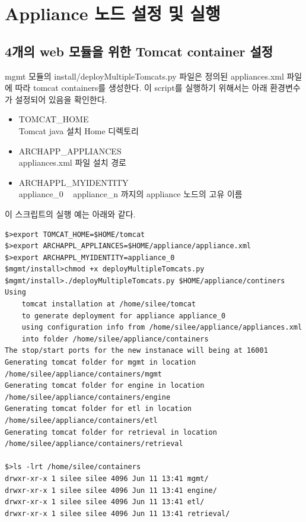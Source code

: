 \documentclass[11pt
  , a4paper
  , article
  , oneside
]{memoir}
\begin{document}
\section{Appliance 노드 설정 및 실행}
\subsection {4개의 web 모듈을 위한 Tomcat container 설정}
 mgmt 모듈의 install/deployMultipleTomcats.py 파일은 정의된 appliances.xml 파일에 따라 tomcat containers를 생성한다. 이 script를 실행하기 위해서는 아래 환경변수가 설정되어 있음을 확인한다.
 \begin{itemize}
 	\item TOMCAT\_HOME \\
 	Tomcat java 설치 Home 디렉토리
 	\item ARCHAPP\_APPLIANCES \\
 	appliances.xml 파일 설치 경로 
 	\item ARCHAPPL\_MYIDENTITY \\
 	appliance\_0 ~ appliance\_n 까지의 appliance 노드의 고유 이름
 \end{itemize}
 
 이 스크립트의 실행 예는 아래와 같다.
 
\begin{lstlisting}[style=termstyle]
$>export TOMCAT_HOME=$HOME/tomcat
$>export ARCHAPPL_APPLIANCES=$HOME/appliance/appliance.xml
$>export ARCHAPPL_MYIDENTITY=appliance_0
$mgmt/install>chmod +x deployMultipleTomcats.py
$mgmt/install>./deployMultipleTomcats.py $HOME/appliance/continers
Using
    tomcat installation at /home/silee/tomcat
    to generate deployment for appliance appliance_0
    using configuration info from /home/silee/appliance/appliances.xml
    into folder /home/silee/appliance/containers
The stop/start ports for the new instanace will being at 16001
Generating tomcat folder for mgmt in location /home/silee/appliance/containers/mgmt
Generating tomcat folder for engine in location /home/silee/appliance/containers/engine
Generating tomcat folder for etl in location /home/silee/appliance/containers/etl
Generating tomcat folder for retrieval in location /home/silee/appliance/containers/retrieval

$>ls -lrt /home/silee/containers
drwxr-xr-x 1 silee silee 4096 Jun 11 13:41 mgmt/
drwxr-xr-x 1 silee silee 4096 Jun 11 13:41 engine/
drwxr-xr-x 1 silee silee 4096 Jun 11 13:41 etl/
drwxr-xr-x 1 silee silee 4096 Jun 11 13:41 retrieval/
\end{lstlisting}
\end{document}
